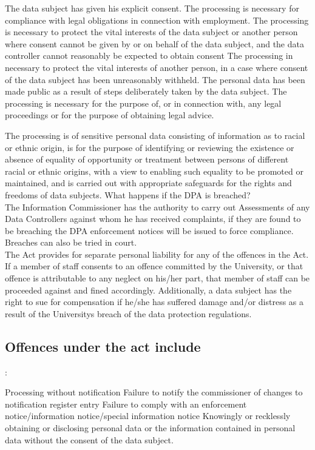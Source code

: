 \documentclass[12pt]{article}
\begin{document}
The data subject has given his explicit consent.
The processing is necessary for compliance with legal obligations in connection with employment.
The processing is necessary to protect the vital interests of the data subject or another person where consent cannot be given by or on behalf of the data subject, and the data controller cannot reasonably be expected to obtain consent
The processing in necessary to protect the vital interests of another person, in a case where consent of the data subject has been unreasonably withheld.
The personal data has been made public as a result of steps deliberately taken by the data subject.
The processing is necessary for the purpose of, or in connection with, any legal proceedings or for the purpose of obtaining legal advice.

The processing is of sensitive personal data consisting of information as to racial or ethnic origin, is for the purpose of identifying or reviewing the existence or absence of equality of opportunity or treatment between persons of different racial or ethnic origins, with a view to enabling such equality to be promoted or maintained, and is carried out with appropriate safeguards for the rights and freedoms of data subjects.
What happens if the DPA is breached?\\
The Information Commissioner has the authority to carry out Assessments of any Data Controllers against whom he has received complaints, if they are found to be breaching the DPA enforcement notices will be issued to force compliance. Breaches can also be tried in court.\\

The Act provides for separate personal liability for any of the offences in the Act. If a member of staff consents to an offence committed by the University, or that offence is attributable to any neglect on his/her part, that member of staff can be proceeded against and fined accordingly. Additionally, a data subject has the right to sue for compensation if he/she has suffered damage and/or distress as a result of the Universitys breach of the data protection regulations.

\subsection{Offences under the act include}:

Processing without notification
Failure to notify the commissioner of changes to notification register entry
Failure to comply with an enforcement notice/information notice/special information notice
Knowingly or recklessly obtaining or disclosing personal data or the information contained in personal data without the consent of the data subject.
\end{document}
